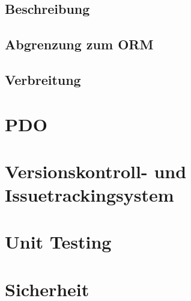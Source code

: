 \subsection{Beschreibung}
\subsection{Abgrenzung zum ORM}
\subsection{Verbreitung}
\section{PDO}
\section{Versionskontroll- und Issuetrackingsystem}

\section{Unit Testing}

\section{Sicherheit}
